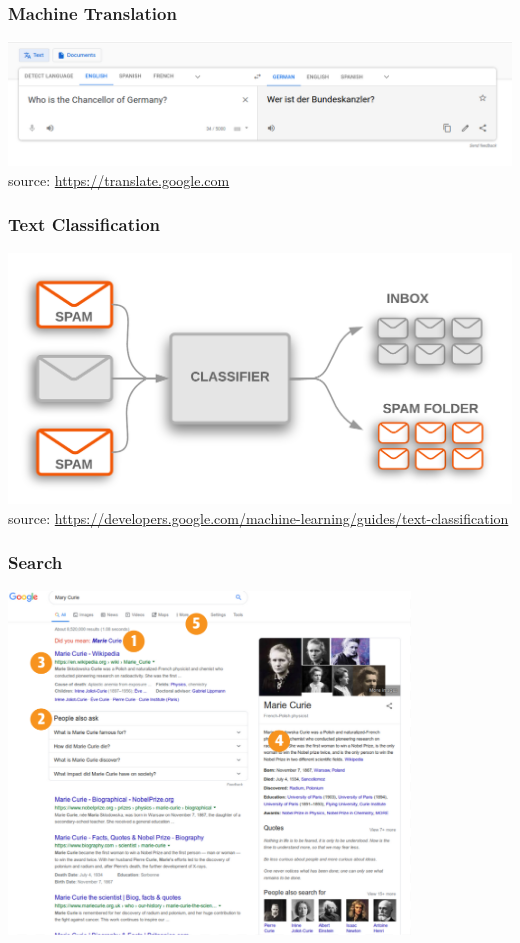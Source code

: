 \documentclass{beamer}
\begin{document}
\begin{frame}
\frametitle{Machine Translation}
\includegraphics[width=\textwidth]{figures/mt.png}
\tiny source: \url{https://translate.google.com}
\end{frame}

\begin{frame}
\frametitle{Text Classification}
 \includegraphics[width=\textwidth]{figures/tc.png}
 \newline
\tiny source: \url{https://developers.google.com/machine-learning/guides/text-classification}
\end{frame}

\begin{frame}
\frametitle{Search}
\includegraphics[width=0.8\textwidth]{figures/nlpsearch.png}
\end{frame}
\end{document}
